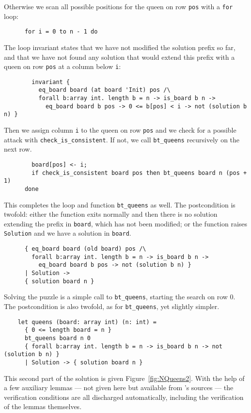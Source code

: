 Otherwise we scan all possible positions for the queen on row
\texttt{pos} with a \texttt{for} loop:
\begin{verbatim}
      for i = 0 to n - 1 do
\end{verbatim}
The loop invariant states that we have not modified the solution
prefix so far, and that we have not found any solution that would
extend this prefix with a queen on row \texttt{pos} at a column below
\texttt{i}:
\begin{verbatim}
        invariant {
          eq_board board (at board 'Init) pos /\
          forall b:array int. length b = n -> is_board b n ->
            eq_board board b pos -> 0 <= b[pos] < i -> not (solution b n) }
\end{verbatim}
Then we assign column \texttt{i} to the queen on row \texttt{pos} and
we check for a possible attack with \verb|check_is_consistent|. If
not, we call \verb|bt_queens| recursively on the next row.
\begin{verbatim}
        board[pos] <- i;
        if check_is_consistent board pos then bt_queens board n (pos + 1)
      done
\end{verbatim}
This completes the loop and function \verb|bt_queens| as well.
The postcondition is twofold: either the function exits normally and
then there is no solution extending the prefix in \texttt{board},
which has not been modified;
or the function raises \texttt{Solution} and we have a solution in
\texttt{board}.
\begin{verbatim}
      { eq_board board (old board) pos /\
        forall b:array int. length b = n -> is_board b n ->
          eq_board board b pos -> not (solution b n) }
      | Solution ->
      { solution board n }
\end{verbatim}
Solving the puzzle is a simple call to \verb|bt_queens|, starting the
search on row 0. The postcondition is also twofold, as for
\verb|bt_queens|, yet slightly simpler.
\begin{verbatim}
    let queens (board: array int) (n: int) =
      { 0 <= length board = n }
      bt_queens board n 0
      { forall b:array int. length b = n -> is_board b n -> not (solution b n) }
      | Solution -> { solution board n }
\end{verbatim}
This second part of the solution is given Figure~\ref{fig:NQueens2}.
With the help of a few auxiliary lemmas --- not given here but available
from \why's sources --- the verification conditions are all discharged
automatically, including the verification of the lemmas themselves.

